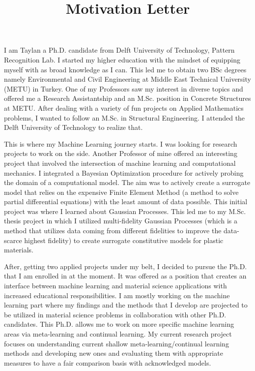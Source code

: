\documentclass{article}
\title{Motivation Letter}
\begin{document}


I am Taylan a Ph.D. candidate from Delft University of Technology, Pattern Recognition Lab. I started my higher education with the mindset of equipping myself with as broad knowledge as I can. This led me to obtain two BSc degrees namely Environmental and Civil Engineering at Middle East Technical University (METU) in Turkey. One of my Professors saw my interest in diverse topics and offered me a Research Assistantship and an M.Sc. position in Concrete Structures at METU. After dealing with a variety of fun projects on Applied Mathematics problems, I wanted to follow an M.Sc. in Structural Engineering. I attended the Delft University of Technology to realize that.

This is where my Machine Learning journey starts. I was looking for research projects to work on the side. Another Professor of mine offered an interesting project that involved the intersection of machine learning and computational mechanics. I integrated a Bayesian Optimization procedure for actively probing the domain of a computational model. The aim was to actively create a surrogate model that relies on the expensive Finite Element Method (a method to solve partial differential equations) with the least amount of data possible. This initial project was where I learned about Gaussian Processes. This led me to my M.Sc. thesis project in which I utilized multi-fidelity Gaussian Processes (which is a method that utilizes data coming from different fidelities to improve the data-scarce highest fidelity) to create surrogate constitutive models for plastic materials. 

After, getting two applied projects under my belt, I decided to pursue the Ph.D. that I am enrolled in at the moment. It was offered as a position that creates an interface between machine learning and material science applications with increased educational responsibilities. I am mostly working on the machine learning part where my findings and the methods that I develop are projected to be utilized in material science problems in collaboration with other Ph.D. candidates. This Ph.D. allows me to work on more specific machine learning areas via meta-learning and continual learning. My current research project focuses on understanding current shallow meta-learning/continual learning methods and developing new ones and evaluating them with appropriate measures to have a fair comparison basis with acknowledged models.
\end{document}
